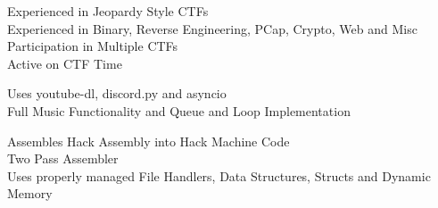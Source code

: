 \documentclass[]{resume}
\begin{document}
\begin{minipage}[t]{0.66\textwidth}
     
    \vspace{4pt}
    \begin{minipage}{0.85\textwidth\vspace{2pt}}
        Experienced in Jeopardy Style CTFs\\
        Experienced in Binary, Reverse Engineering, PCap, Crypto, Web and Misc\\
        Participation in Multiple CTFs\\
        Active on CTF Time
    \end{minipage}

    \vspace{8pt}
     
    \vspace{4pt}
    \begin{minipage}{0.85\textwidth\vspace{2pt}}
        Uses youtube-dl, discord.py and asyncio\\
        Full Music Functionality and Queue and Loop Implementation
    \end{minipage}

    \vspace{8pt}
     
    \vspace{4pt}
    \begin{minipage}{0.85\textwidth\vspace{2pt}}
        Assembles Hack Assembly into Hack Machine Code\\
        Two Pass Assembler\\
        Uses properly managed File Handlers, Data Structures, Structs and Dynamic Memory
    \end{minipage}

\end{minipage}
\end{document}
